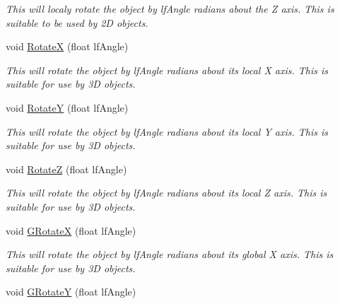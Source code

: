 \begin{DoxyCompactItemize}
\begin{DoxyCompactList}\small\item\em This will localy rotate the object by lfAngle radians about the Z axis. This is suitable to be used by 2D objects. \end{DoxyCompactList}\item 
\hypertarget{classc_camera_matrix4_abb8a5e1d961915829f3200b74319af61}{
void \hyperlink{classc_camera_matrix4_abb8a5e1d961915829f3200b74319af61}{RotateX} (float lfAngle)}
\label{classc_camera_matrix4_abb8a5e1d961915829f3200b74319af61}

\begin{DoxyCompactList}\small\item\em This will rotate the object by lfAngle radians about its local X axis. This is suitable for use by 3D objects. \end{DoxyCompactList}\item 
\hypertarget{classc_camera_matrix4_a86e20cd48f8a5427d98361d9b838273d}{
void \hyperlink{classc_camera_matrix4_a86e20cd48f8a5427d98361d9b838273d}{RotateY} (float lfAngle)}
\label{classc_camera_matrix4_a86e20cd48f8a5427d98361d9b838273d}

\begin{DoxyCompactList}\small\item\em This will rotate the object by lfAngle radians about its local Y axis. This is suitable for use by 3D objects. \end{DoxyCompactList}\item 
\hypertarget{classc_camera_matrix4_ab0d7c6b5cdc0b9581633736404a3b843}{
void \hyperlink{classc_camera_matrix4_ab0d7c6b5cdc0b9581633736404a3b843}{RotateZ} (float lfAngle)}
\label{classc_camera_matrix4_ab0d7c6b5cdc0b9581633736404a3b843}

\begin{DoxyCompactList}\small\item\em This will rotate the object by lfAngle radians about its local Z axis. This is suitable for use by 3D objects. \end{DoxyCompactList}\item 
\hypertarget{classc_camera_matrix4_a09c8d44629bf63643c8f09ccdc2294bc}{
void \hyperlink{classc_camera_matrix4_a09c8d44629bf63643c8f09ccdc2294bc}{GRotateX} (float lfAngle)}
\label{classc_camera_matrix4_a09c8d44629bf63643c8f09ccdc2294bc}

\begin{DoxyCompactList}\small\item\em This will rotate the object by lfAngle radians about its global X axis. This is suitable for use by 3D objects. \end{DoxyCompactList}\item 
\hypertarget{classc_camera_matrix4_a48eb5374c0e7fa4eca25f48a6411052d}{
void \hyperlink{classc_camera_matrix4_a48eb5374c0e7fa4eca25f48a6411052d}{GRotateY} (float lfAngle)}
\label{classc_camera_matrix4_a48eb5374c0e7fa4eca25f48a6411052d}


\end{DoxyCompactItemize}

